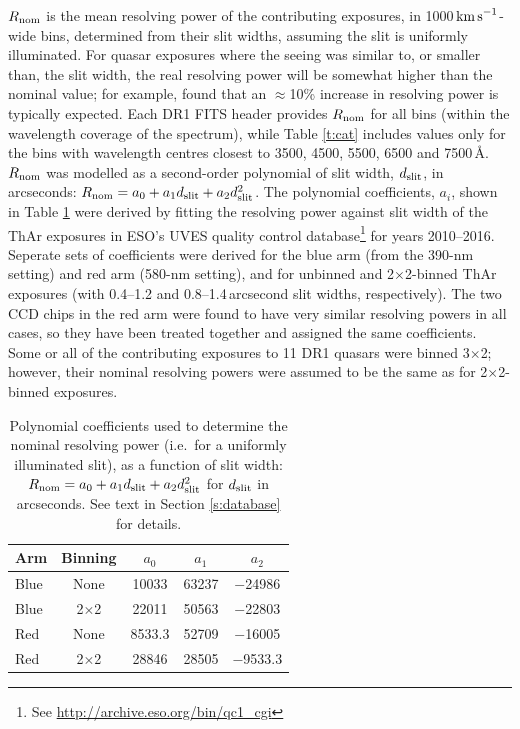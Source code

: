\documentclass[fleqn,usenatbib,usedcolumn]{mnras}
\newcommand{\Sref}[1]{Section \ref{#1}}
\newcommand{\Tref}[1]{Table \ref{#1}}
\newcommand{\kms}{\ensuremath{\textrm{km\,s}^{-1}}}
\begin{document}
$R_{\rm nom}$ is the mean resolving power of the contributing exposures, in 1000\,\kms-wide bins, determined from their slit widths, assuming the slit is uniformly illuminated. For quasar exposures where the seeing was similar to, or smaller than, the slit width, the real resolving power will be somewhat higher than the nominal value; for example, \citet{Kotus:2017:3679} found that an $\approx$10\% increase in resolving power is typically expected. Each DR1 FITS header provides $R_{\rm nom}$ for all bins (within the wavelength coverage of the spectrum), while \Tref{t:cat} includes values only for the bins with wavelength centres closest to 3500, 4500, 5500, 6500 and 7500\,\AA. $R_{\rm nom}$ was modelled as a second-order polynomial of slit width, $d_{\rm slit}$, in arcseconds: $R_{\rm nom}=a_0+a_1d_{\rm slit}+a_2d_{\rm slit}^2$. The polynomial coefficients, $a_i$, shown in \Tref{t:nom_resol} were derived by fitting the resolving power against slit width of the ThAr exposures in ESO's UVES quality control database\footnote{See \url{http://archive.eso.org/bin/qc1_cgi}} for years 2010--2016. Seperate sets of coefficients were derived for the blue arm (from the 390-nm setting) and red arm (580-nm setting), and for unbinned and 2$\times$2-binned ThAr exposures (with 0.4--1.2 and 0.8--1.4\,arcsecond slit widths, respectively). The two CCD chips in the red arm were found to have very similar resolving powers in all cases, so they have been treated together and assigned the same coefficients. Some or all of the contributing exposures to 11 DR1 quasars were binned 3$\times$2; however, their nominal resolving powers were assumed to be the same as for 2$\times$2-binned exposures.

\begin{table}
\caption{Polynomial coefficients used to determine the nominal resolving power (i.e.\ for a uniformly illuminated slit), as a function of slit width: $R_{\rm nom}=a_0+a_1d_{\rm slit}+a_2d_{\rm slit}^2$ for $d_{\rm slit}$ in arcseconds. See text in \Sref{s:database} for details.}
\begin{center}
\label{t:nom_resol}
\begin{tabular}{lcccc}
\hline
 \multicolumn{1}{c}{Arm} & Binning    & $a_0$  & $a_1$ & $a_2$   \\
\hline
 Blue                    & None       & 10033  & 63237 & $-$24986  \\
 Blue                    & 2$\times$2 & 22011  & 50563 & $-$22803  \\
 Red                     & None       & 8533.3 & 52709 & $-$16005  \\
 Red                     & 2$\times$2 & 28846  & 28505 & $-$9533.3 \\
\hline
\end{tabular}
\end{center}
\end{table}
\end{document}
